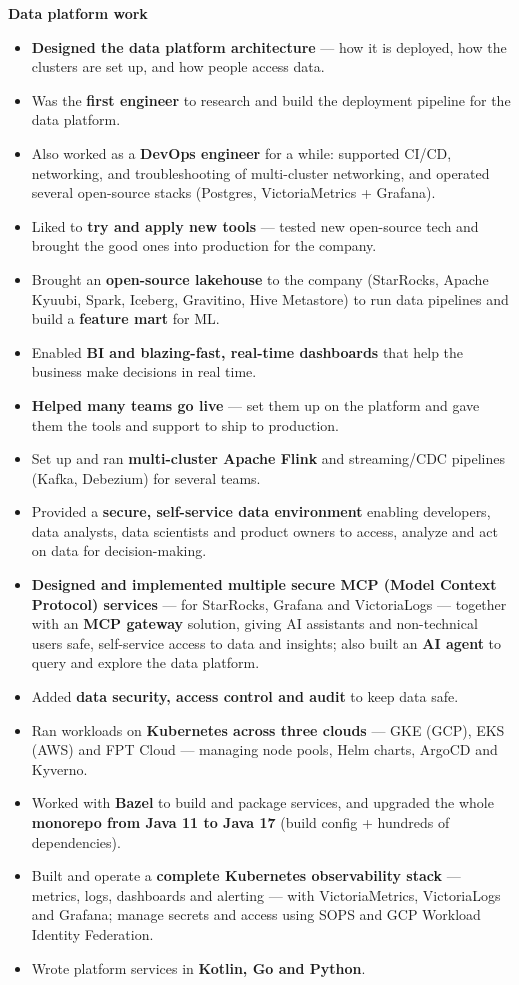 \documentclass[10pt,a4paper]{article}
\begin{document}
\textbf{Data platform work}
\begin{itemize}
  \item \textbf{Designed the data platform architecture} --- how it is deployed, how the clusters are set up, and how people access data.
  \item Was the \textbf{first engineer} to research and build the deployment pipeline for the data platform.
  \item Also worked as a \textbf{DevOps engineer} for a while: supported CI/CD, networking, and troubleshooting of multi-cluster networking, and operated several open-source stacks (Postgres, VictoriaMetrics + Grafana).
  \item Liked to \textbf{try and apply new tools} --- tested new open-source tech and brought the good ones into production for the company.
  \item Brought an \textbf{open-source lakehouse} to the company (StarRocks, Apache Kyuubi, Spark, Iceberg, Gravitino, Hive Metastore) to run data pipelines and build a \textbf{feature mart} for ML.
  \item Enabled \textbf{BI and blazing-fast, real-time dashboards} that help the business make decisions in real time.
  \item \textbf{Helped many teams go live} --- set them up on the platform and gave them the tools and support to ship to production.
  \item Set up and ran \textbf{multi-cluster Apache Flink} and streaming/CDC pipelines (Kafka, Debezium) for several teams.
  \item Provided a \textbf{secure, self-service data environment} enabling developers, data analysts, data scientists and product owners to access, analyze and act on data for decision-making.
  \item \textbf{Designed and implemented multiple secure MCP (Model Context Protocol) services} --- for StarRocks, Grafana and VictoriaLogs --- together with an \textbf{MCP gateway} solution, giving AI assistants and non-technical users safe, self-service access to data and insights; also built an \textbf{AI agent} to query and explore the data platform.
  \item Added \textbf{data security, access control and audit} to keep data safe.
  \item Ran workloads on \textbf{Kubernetes across three clouds} --- GKE (GCP), EKS (AWS) and FPT Cloud --- managing node pools, Helm charts, ArgoCD and Kyverno.
  \item Worked with \textbf{Bazel} to build and package services, and upgraded the whole \textbf{monorepo from Java 11 to Java 17} (build config + hundreds of dependencies).
  \item Built and operate a \textbf{complete Kubernetes observability stack} --- metrics, logs, dashboards and alerting --- with VictoriaMetrics, VictoriaLogs and Grafana; manage secrets and access using SOPS and GCP Workload Identity Federation.
  \item Wrote platform services in \textbf{Kotlin, Go and Python}.
\end{itemize}
\end{document}

